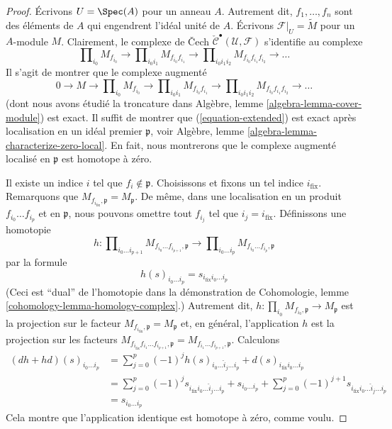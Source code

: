 \begin{proof}
Écrivons $U = \Spec(A)$ pour un anneau $A$.
Autrement dit, $f_1, \ldots, f_n$ sont des éléments de $A$
qui engendrent l'idéal unité de $A$.
Écrivons $\mathcal{F}|_U = \widetilde{M}$ pour un $A$-module $M$.
Clairement, le complexe de {\v C}ech
$\check{\mathcal{C}}^\bullet(\mathcal{U}, \mathcal{F})$
s'identifie au complexe
$$
\prod\nolimits_{i_0} M_{f_{i_0}} \to
\prod\nolimits_{i_0i_1} M_{f_{i_0}f_{i_1}} \to
\prod\nolimits_{i_0i_1i_2} M_{f_{i_0}f_{i_1}f_{i_2}} \to
\ldots
$$
Il s'agit de montrer que le complexe augmenté
\begin{equation}
\label{equation-extended}
0 \to
M \to
\prod\nolimits_{i_0} M_{f_{i_0}} \to
\prod\nolimits_{i_0i_1} M_{f_{i_0}f_{i_1}} \to
\prod\nolimits_{i_0i_1i_2} M_{f_{i_0}f_{i_1}f_{i_2}} \to
\ldots
\end{equation}
(dont nous avons étudié la troncature dans
Algèbre, lemme \ref{algebra-lemma-cover-module}) est exact.
Il suffit de montrer que (\ref{equation-extended})
est exact après localisation en un idéal premier $\mathfrak p$, voir
Algèbre, lemme \ref{algebra-lemma-characterize-zero-local}.
En fait, nous montrerons que le complexe augmenté localisé
en $\mathfrak p$ est homotope à zéro.

\medskip\noindent
Il existe un indice $i$ tel que $f_i \not \in \mathfrak p$.
Choisissons et fixons un tel indice $i_{\text{fix}}$. Remarquons que
$M_{f_{i_{\text{fix}}}, \mathfrak p} = M_{\mathfrak p}$. De même,
dans une localisation en un produit $f_{i_0} \ldots f_{i_p}$ et en $\mathfrak p$,
nous pouvons omettre tout $f_{i_j}$ tel que $i_j = i_{\text{fix}}$.
Définissons une homotopie
$$
h :
\prod\nolimits_{i_0 \ldots i_{p + 1}}
M_{f_{i_0} \ldots f_{i_{p + 1}}, \mathfrak p}
\longrightarrow
\prod\nolimits_{i_0 \ldots i_p}
M_{f_{i_0} \ldots f_{i_p}, \mathfrak p}
$$
par la formule
$$
h(s)_{i_0 \ldots i_p} = s_{i_{\text{fix}} i_0 \ldots i_p}
$$
(Ceci est ``dual'' de l'homotopie dans la démonstration de
Cohomologie, lemme \ref{cohomology-lemma-homology-complex}.)
Autrement dit, $h : \prod_{i_0} M_{f_{i_0}, \mathfrak p} \to M_\mathfrak p$
est la projection sur le facteur
$M_{f_{i_{\text{fix}}}, \mathfrak p} = M_{\mathfrak p}$ et, en général,
l'application $h$ est la projection sur les facteurs
$M_{f_{i_{\text{fix}}} f_{i_1} \ldots f_{i_{p + 1}}, \mathfrak p}
= M_{f_{i_1} \ldots f_{i_{p + 1}}, \mathfrak p}$. Calculons
\begin{align*}
(dh + hd)(s)_{i_0 \ldots i_p}
& =
\sum\nolimits_{j = 0}^p
(-1)^j
h(s)_{i_0 \ldots \hat i_j \ldots i_p}
+
d(s)_{i_{\text{fix}} i_0 \ldots i_p}\\
& =
\sum\nolimits_{j = 0}^p
(-1)^j
s_{i_{\text{fix}} i_0 \ldots \hat i_j \ldots i_p}
+
s_{i_0 \ldots i_p}
+
\sum\nolimits_{j = 0}^p
(-1)^{j + 1}
s_{i_{\text{fix}} i_0 \ldots \hat i_j \ldots i_p} \\
& =
s_{i_0 \ldots i_p}
\end{align*}
Cela montre que l'application identique est homotope à zéro, comme voulu.
\end{proof}

